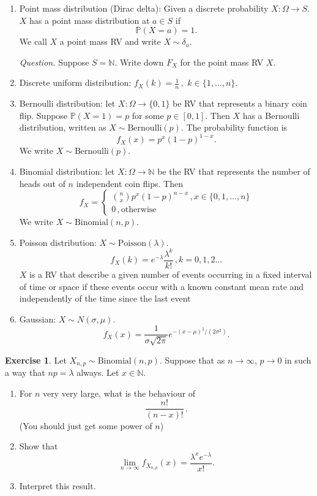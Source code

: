 \documentclass[
  openany]{book}
\theoremstyle{definition}
\theoremstyle{definition}
\theoremstyle{definition}
\newtheorem{exercise}{Exercise}[chapter]
\theoremstyle{definition}
\theoremstyle{remark}
\begin{document}
\begin{enumerate}
\def\labelenumi{\arabic{enumi}.}
\item
  Point mass distribution (Dirac delta):
  Given a discrete probability \(X: \Omega \to S\). \(X\) has a point mass distribution at \(a \in S\)
  if
  \[ \mathbb{P}( X = a) = 1.\]
  We call \(X\) a point mass RV and write \(X \sim \delta_a\).

  \emph{Question.} Suppose \(S = \mathbb{N}\). Write down \(F_X\) for the point mass RV \(X\).
\item
  Discrete uniform distribution:
  \(f_X(k) = \frac 1 n\,,\)
  \(k \in \{1,\dots, n\}\).
\item
  Bernoulli distribution:
  let \(X:\Omega \to \{0,1\}\) be RV that represents a binary coin flip.
  Suppose \(\mathbb{P}(X = 1) = p\) for some \(p \in [0,1]\).
  Then \(X\) has a Bernoulli distribution, written as \(X \sim \text{Bernoulli}(p)\).
  The probability function is
  \[f_X(x) = p^x (1-p)^{1-x}.\]
  We write \(X \sim \text{Bernoulli}(p)\).
\item
  Binomial distribution:
  let \(X:\Omega \to \mathbb{N}\) be the RV that represents the number of heads out of \(n\) independent coin flips.
  Then
  \[ f_X = \begin{cases}
  {n \choose x} p^x (1-p)^{n-x}\,, x\in \{0,1,\dots, n\}\\
       0 \,, \text{otherwise}
  \end{cases}\]
  We write \(X \sim \text{Binomial}(n,p)\).
\item
  Poisson distribution: \(X \sim \text{Poisson}(\lambda)\).
  \[f_X (k) = e^{-\lambda} \frac{\lambda^k}{k!}\,, k = 0, 1, 2 \dots\]
  \(X\) is a RV that describe a given number of events occurring in a
  fixed interval of time or space if these events occur with a known constant mean rate and
  independently of the time since the last event
\item
  Gaussian: \(X \sim N(\sigma,\mu)\).
  \[f_X(x) = \frac{1}{\sigma\sqrt{2\pi}} e^{-(x-\mu)^2/(2\sigma^2)}.\]
\end{enumerate}

\begin{exercise}

Let \(X_{n,p} \sim \text{Binomial}(n,p)\). Suppose that as \(n\to \infty\), \(p \to 0\) in such a way
that \(np = \lambda\) always.
Let \(x\in \mathbb{N}\).

\begin{enumerate}
\def\labelenumi{\arabic{enumi}.}
\item
  For \(n\) very very large, what is the behaviour of\\
  \[ \frac{n!}{(n-x)!} \,.\]
  (You should just get some power of \(n\))
\item
  Show that
  \[\lim_{n\to \infty} f_{X_{n,p}}(x) = \frac{\lambda^x e^{-\lambda}}{x!}.\]
\item
  Interpret this result.
\end{enumerate}

\end{exercise}
\end{document}

